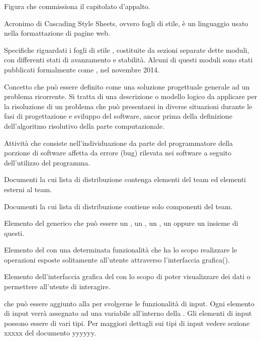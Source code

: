 Figura che commissiona il capitolato d’appalto.

Acronimo di Cascading Style Sheets, ovvero fogli di stile, \`e un linguaggio usato nella formattazione di pagine web.

Specifiche riguardati i fogli di stile , costituite da sezioni separate dette moduli, con differenti stati di avanzamento e stabilit\`a. Alcuni di questi moduli sono stati pubblicati formalmente come , nel novembre 2014.
\clearpage

Concetto che può essere definito come una soluzione progettuale generale ad un problema ricorrente. Si tratta di una descrizione o modello logico da applicare per la risoluzione di un problema che può presentarsi in diverse situazioni durante le fasi di progettazione e sviluppo del software, ancor prima della definizione dell'algoritmo risolutivo della parte computazionale.

Attività che consiste nell'individuazione da parte del programmatore della porzione di software affetta da errore (bug) rilevata nei software a seguito dell'utilizzo del programma.

Documenti la cui lista di distribuzione contenga elementi del team ed elementi esterni al team.

Documenti la cui lista di distribuzione contiene solo componenti del team.
\clearpage

Elemento del  generico che può essere un , un , un , un  oppure un insieme di questi.

Elemento del  con una determinata funzionalità che ha lo scopo realizzare le operazioni esposte solitamente all’utente attraverso l’interfaccia grafica().

Elemento dell’interfaccia grafica del  con lo scopo di poter visualizzare dei dati o permettere all’utente di interagire.

 che può essere aggiunto alla  per svolgerne le funzionalit\`a di input. Ogni elemento di input verr\`a assegnato ad una variabile all’interno della . Gli elementi di input possono essere di vari tipi. Per maggiori dettagli sui tipi di input vedere sezione xxxxx del documento yyyyyy.

